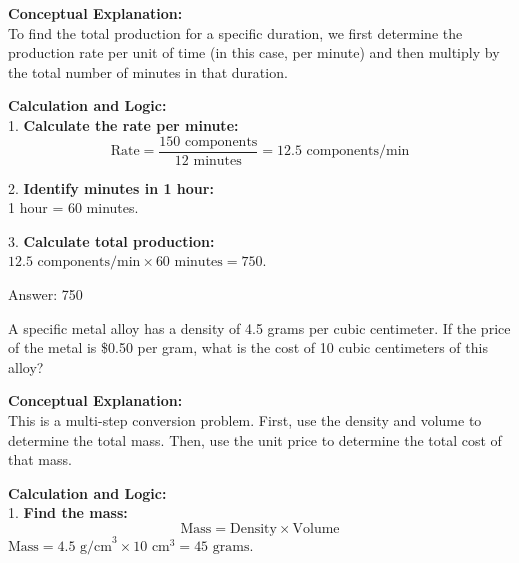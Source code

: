 \documentclass[11pt,paper=a4,answers]{exam}
\begin{document}
\begin{questions}
\begin{solution}
\textbf{Conceptual Explanation:} \\
To find the total production for a specific duration, we first determine the production rate per unit of time (in this case, per minute) and then multiply by the total number of minutes in that duration.

\vspace{30pt}

\textbf{Calculation and Logic:} \\
1. \textbf{Calculate the rate per minute:} \\
\[ \text{Rate} = \frac{150 \text{ components}}{12 \text{ minutes}} = 12.5 \text{ components/min} \]

\vspace{15pt}

2. \textbf{Identify minutes in 1 hour:} \\
1 hour = 60 minutes.

\vspace{15pt}

3. \textbf{Calculate total production:} \\
$12.5 \text{ components/min} \times 60 \text{ minutes} = 750$.

\vspace{30pt}

Answer: \colorbox{yellow!100}{750}
\end{solution}

\vspace{60pt}

\question
A specific metal alloy has a density of 4.5 grams per cubic centimeter. If the price of the metal is \$0.50 per gram, what is the cost of 10 cubic centimeters of this alloy?

\begin{solution}
\textbf{Conceptual Explanation:} \\
This is a multi-step conversion problem. First, use the density and volume to determine the total mass. Then, use the unit price to determine the total cost of that mass.

\vspace{30pt}

\textbf{Calculation and Logic:} \\
1. \textbf{Find the mass:} \\
\[ \text{Mass} = \text{Density} \times \text{Volume} \]
$\text{Mass} = 4.5 \text{ g/cm}^3 \times 10 \text{ cm}^3 = 45 \text{ grams}$.


\end{solution}
\end{questions}
\end{document}
